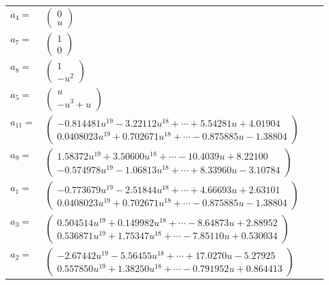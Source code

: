 \documentclass[1p]{elsarticle_modified}
\theoremstyle{definition}
\begin{document}
\begin{tabular}{m{7pt} m{180pt} m{7pt} m{180pt} }
\flushright $a_{4}=$&$\begin{pmatrix}0\\u\end{pmatrix}$ \\
\flushright $a_{7}=$&$\begin{pmatrix}1\\0\end{pmatrix}$ \\
\flushright $a_{8}=$&$\begin{pmatrix}1\\- u^2\end{pmatrix}$ \\
\flushright $a_{5}=$&$\begin{pmatrix}u\\- u^3+u\end{pmatrix}$ \\
\flushright $a_{11}=$&$\begin{pmatrix}-0.814481 u^{19}-3.22112 u^{18}+\cdots+5.54281 u+4.01904\\0.0408023 u^{19}+0.702671 u^{18}+\cdots-0.875885 u-1.38804\end{pmatrix}$ \\
\flushright $a_{9}=$&$\begin{pmatrix}1.58372 u^{19}+3.50600 u^{18}+\cdots-10.4039 u+8.22100\\-0.574978 u^{19}-1.06813 u^{18}+\cdots+8.33960 u-3.10784\end{pmatrix}$ \\
\flushright $a_{1}=$&$\begin{pmatrix}-0.773679 u^{19}-2.51844 u^{18}+\cdots+4.66693 u+2.63101\\0.0408023 u^{19}+0.702671 u^{18}+\cdots-0.875885 u-1.38804\end{pmatrix}$ \\
\flushright $a_{3}=$&$\begin{pmatrix}0.504514 u^{19}+0.149982 u^{18}+\cdots-8.64873 u+2.88952\\0.536871 u^{19}+1.75347 u^{18}+\cdots-7.85110 u+0.530034\end{pmatrix}$ \\
\flushright $a_{2}=$&$\begin{pmatrix}-2.67442 u^{19}-5.56455 u^{18}+\cdots+17.0270 u-5.27925\\0.557850 u^{19}+1.38250 u^{18}+\cdots-0.791952 u+0.864413\end{pmatrix}$ \\

\end{tabular}
\end{document}
